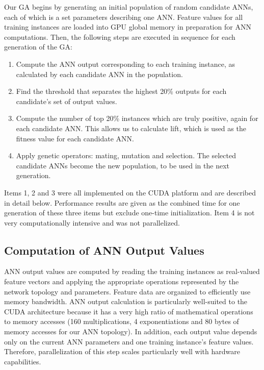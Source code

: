 \documentclass[11pt]{article}       %
\begin{document}
Our GA begins by generating an initial population of random candidate ANNs, each of which is a set parameters describing one ANN. Feature values for all training instances are loaded into GPU global memory in preparation for ANN computations. Then, the following steps are executed in sequence for each generation of the GA:

\begin{enumerate}
	\item Compute the ANN output corresponding to each training instance, as calculated by each candidate ANN in the population.
	\item Find the threshold that separates the highest 20\% outputs for each candidate's set of output values.
	\item Compute the number of top 20\% instances which are truly positive, again for each candidate ANN. This allows us to calculate lift, which is used as the fitness value for each candidate ANN.
	\item Apply genetic operators: mating, mutation and selection. The selected candidate ANNs become the new population, to be used in the next generation.
\end{enumerate}

Items 1, 2 and 3 were all implemented on the CUDA platform and are described in detail below. Performance results are given as the combined time for one generation of these three items but exclude one-time initialization. Item 4 is not very computationally intensive and was not parallelized. 

\subsection{Computation of ANN Output Values} \label{implementation}
ANN output values are computed by reading the training instances as real-valued feature vectors and applying the appropriate operations represented by the network topology and parameters. Feature data are organized to efficiently use memory bandwidth. ANN output calculation is particularly well-suited to the CUDA architecture because it has a very high ratio of mathematical operations to memory accesses (160 multiplications, 4 exponentiations and 80 bytes of memory accesses for our ANN topology). In addition, each output value depends only on the current ANN parameters and one training instance's feature values. Therefore, parallelization of this step scales particularly well with hardware capabilities.
\end{document}
